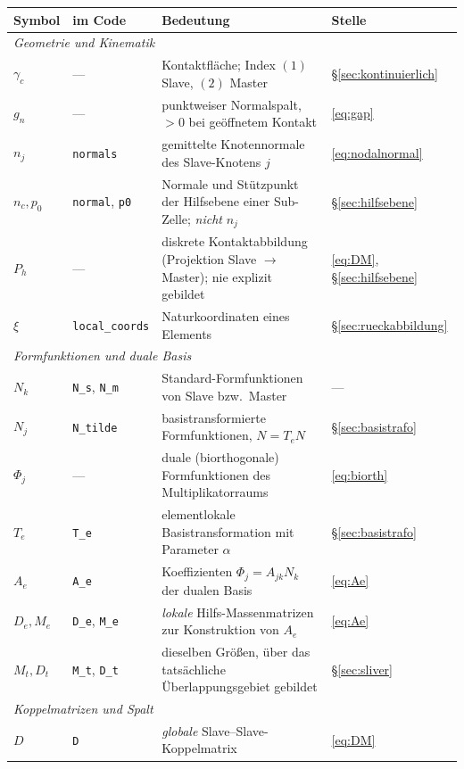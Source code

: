 \documentclass[a4paper,11pt]{article}
\def\bm#1{#1}%
\def\tilde#1{#1}%
\newcommand{\code}[1]{\texttt{\small #1}}
\begin{document}
\begin{center}
\small
\begin{tabularx}{\linewidth}{llXl}
\toprule
Symbol & im Code & Bedeutung & Stelle \\
\midrule
\multicolumn{4}{l}{\emph{Geometrie und Kinematik}}\\
$\gamma_c$ & --- & Kontaktfläche; Index $(1)$ Slave, $(2)$ Master & \S\ref{sec:kontinuierlich} \\
$g_n$ & --- & punktweiser Normalspalt, $>0$ bei geöffnetem Kontakt & \eqref{eq:gap} \\
$\bm n_j$ & \code{normals} & gemittelte Knotennormale des Slave-Knotens $j$ & \eqref{eq:nodalnormal} \\
$\bm n_c,\bm p_0$ & \code{normal}, \code{p0} & Normale und Stützpunkt der Hilfsebene einer Sub-Zelle; \emph{nicht} $\bm n_j$ & \S\ref{sec:hilfsebene} \\
$P_h$ & --- & diskrete Kontaktabbildung (Projektion Slave $\to$ Master); nie explizit gebildet & \eqref{eq:DM}, \S\ref{sec:hilfsebene} \\
$\bm\xi$ & \code{local\_coords} & Naturkoordinaten eines Elements & \S\ref{sec:rueckabbildung} \\
\midrule
\multicolumn{4}{l}{\emph{Formfunktionen und duale Basis}}\\
$N_k$ & \code{N\_s}, \code{N\_m} & Standard-Formfunktionen von Slave bzw.\ Master & --- \\
$\tilde N_j$ & \code{N\_tilde} & basistransformierte Formfunktionen, $\tilde{\bm N}=\bm T_e\bm N$ & \S\ref{sec:basistrafo} \\
$\Phi_j$ & --- & duale (biorthogonale) Formfunktionen des Multiplikatorraums & \eqref{eq:biorth} \\
$\bm T_e$ & \code{T\_e} & elementlokale Basistransformation mit Parameter $\alpha$ & \S\ref{sec:basistrafo} \\
$\bm A_e$ & \code{A\_e} & Koeffizienten $\Phi_j=A_{jk}N_k$ der dualen Basis & \eqref{eq:Ae} \\
$\bm D_e,\bm M_e$ & \code{D\_e}, \code{M\_e} & \emph{lokale} Hilfs-Massenmatrizen zur Konstruktion von $\bm A_e$ & \eqref{eq:Ae} \\
$\bm M_t,\bm D_t$ & \code{M\_t}, \code{D\_t} & dieselben Größen, über das tatsächliche Überlappungsgebiet gebildet & \S\ref{sec:sliver} \\
\midrule
\multicolumn{4}{l}{\emph{Koppelmatrizen und Spalt}}\\
$\bm D$ & \code{D} & \emph{globale} Slave--Slave-Koppelmatrix & \eqref{eq:DM} \\

\end{tabularx}
\end{center}
\end{document}
